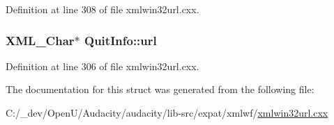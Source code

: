 Definition at line 308 of file xmlwin32url.\+cxx.

\subsubsection[{\texorpdfstring{url}{url}}]{ {\bf X\+M\+L\+\_\+\+Char}$\ast$ Quit\+Info\+::url}\hypertarget{struct_quit_info_ad49635fec369e07bbfb6c720cbd0fa73}{}\label{struct_quit_info_ad49635fec369e07bbfb6c720cbd0fa73}


Definition at line 306 of file xmlwin32url.\+cxx.



The documentation for this struct was generated from the following file\+:\begin{DoxyCompactItemize}
\item 
C\+:/\+\_\+dev/\+Open\+U/\+Audacity/audacity/lib-\/src/expat/xmlwf/\hyperlink{xmlwin32url_8cxx}{xmlwin32url.\+cxx}\end{DoxyCompactItemize}
